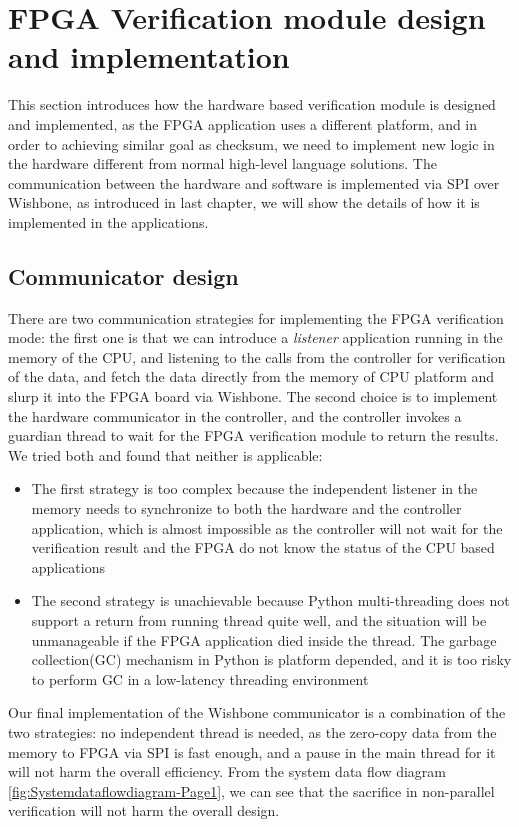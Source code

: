 \documentclass[11pt,openright,a4paper]{report}
\begin{document}
\section{FPGA Verification module design and implementation}
This section introduces how the hardware based verification module is designed and implemented, as the FPGA application uses a different platform, and in order to achieving similar goal as checksum, we need to implement new logic in the hardware different from normal high-level language solutions. The communication between the hardware and software is implemented via SPI over Wishbone, as introduced in last chapter, we will show the details of how it is implemented in the applications.\\
\subsection{Communicator design}
There are two communication strategies for implementing the FPGA verification mode: the first one is that we can introduce a \textit{listener} application running in the memory of the CPU, and listening to the calls from the controller for verification of the data, and fetch the data directly from the memory of CPU platform and slurp it into the FPGA board via Wishbone. The second choice is to implement the hardware communicator in the controller, and the controller invokes a guardian thread to wait for the FPGA verification module to return the results.\\
We tried both and found that neither is applicable:
\begin{itemize}
	\item The first strategy is too complex because the independent listener in the memory needs to synchronize to both the hardware and the controller application, which is almost impossible as the controller will not wait for the verification result and the FPGA do not know the status of the CPU based applications
	\item The second strategy is unachievable because Python multi-threading does not support a return from running thread quite well, and the situation will be unmanageable if the FPGA application died inside the thread. The garbage collection(GC) mechanism in Python is platform depended, and it is too risky to perform GC in a low-latency threading environment\cite{hugunin1997python}
\end{itemize}
Our final implementation of the Wishbone communicator is a combination of the two strategies: no independent thread is needed, as the zero-copy data from the memory to FPGA via SPI is fast enough, and a pause in the main thread for it will not harm the overall efficiency. From the system data flow diagram \ref{fig:Systemdataflowdiagram-Page1}, we can see that the sacrifice in non-parallel verification will not harm the overall design.\\
\end{document}

